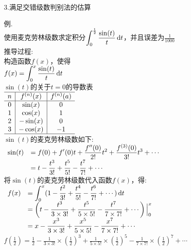 3.满足交错级数判别法的估算
{\par\centering
{}
\par}
例.\\
使用麦克劳林级数求定积分$\displaystyle\int_0^{\frac{1}{2}}\frac{\sin(t)}{t}\mathop{}\!\mathrm{d} t$，并且误差为$\displaystyle\frac{1}{1000}$\\
推导过程:\\
构造函数$f(x)$，使得\\
$\displaystyle f(x)=\int_0^x\frac{\sin(t)}{t}\mathop{}\!\mathrm{d} t$\\
$\sin(t)$的关于$t=0$的导数表\\[1ex]
$\begin{array}{c|c|c}
\hline
n & f^{(n)}(x) & f^{(n)}(a)\\
\hline
0 & \sin(x) & 0\\
1 & \cos(x) & 1\\
2 & -\sin(x) & 0\\
3 & -\cos(x) & -1\\
\hline
\end{array}$\\[1ex]
$\sin(t)$的麦克劳林级数如下:\\
$\begin{array}{>{\displaystyle}r >{\displaystyle}l}
\sin(t) & =f(0)+f'(0)t+\frac{f''(0)}{2!}t^2+\frac{f^{(3)}(0)}{3!}t^3+\cdots\\[1ex]
& =t-\frac{t^3}{3!}+\frac{t^5}{5!}-\frac{t^7}{7!}+\cdots
\end{array}$\\[1ex]
将$\sin(t)$的麦克劳林级数代入函数$f(x)$，得:\\
$\begin{array}{>{\displaystyle}r >{\displaystyle}l}
f(x) & =\int_0^x(1-\frac{t^2}{3!}+\frac{t^4}{5!}-\frac{t^6}{7!}+\cdots)\dif t\\[1ex]
& =\left(t-\frac{t^3}{3\times 3!}+\frac{t^5}{5\times 5!}-\frac{t^7}{7\times 7!}+\cdots\right)\Big|_0^x\\[1ex]
& =x-\frac{x^3}{3\times 3!}+\frac{x^5}{5\times 5!}-\frac{x^7}{7\times 7!}+\cdots
\end{array}$\\[1ex]
$\displaystyle f(\frac{1}{2})=\frac{1}{2}-\frac{1}{3\times 3!}\times(\frac{1}{2})^3+\frac{1}{5\times 5!}\times(\frac{1}{2})^5-\frac{1}{7\times 7!}\times(\frac{1}{2})^7+\cdots$\\
